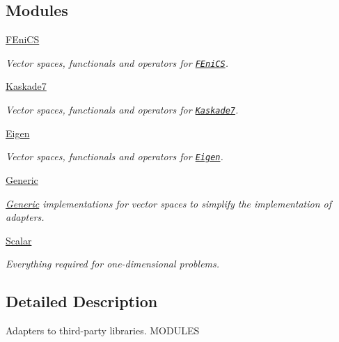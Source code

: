 \subsection*{\-Modules}
\begin{DoxyCompactItemize}
\item 
\hyperlink{group__FenicsGroup}{\-F\-Eni\-C\-S}
\begin{DoxyCompactList}\small\item\em \-Vector spaces, functionals and operators for \href{http://www.fenicsproject.org}{\tt \-F\-Eni\-C\-S}. \end{DoxyCompactList}\item 
\hyperlink{group__KaskadeGroup}{\-Kaskade7}
\begin{DoxyCompactList}\small\item\em \-Vector spaces, functionals and operators for \href{http://www.zib.de/projects/kaskade7-finite-element-toolbox}{\tt \-Kaskade7}. \end{DoxyCompactList}\item 
\hyperlink{group__EigenGroup}{\-Eigen}
\begin{DoxyCompactList}\small\item\em \-Vector spaces, functionals and operators for \href{http://eigen.tuxfamily.org}{\tt \-Eigen}. \end{DoxyCompactList}\item 
\hyperlink{group__GenericGroup}{\-Generic}
\begin{DoxyCompactList}\small\item\em \hyperlink{namespaceSpacy_1_1Generic}{\-Generic} implementations for vector spaces to simplify the implementation of adapters. \end{DoxyCompactList}\item 
\hyperlink{group__ScalarGroup}{\-Scalar}
\begin{DoxyCompactList}\small\item\em \-Everything required for one-\/dimensional problems. \end{DoxyCompactList}\end{DoxyCompactItemize}


\subsection{\-Detailed \-Description}
\-Adapters to third-\/party libraries. \-M\-O\-D\-U\-L\-E\-S 